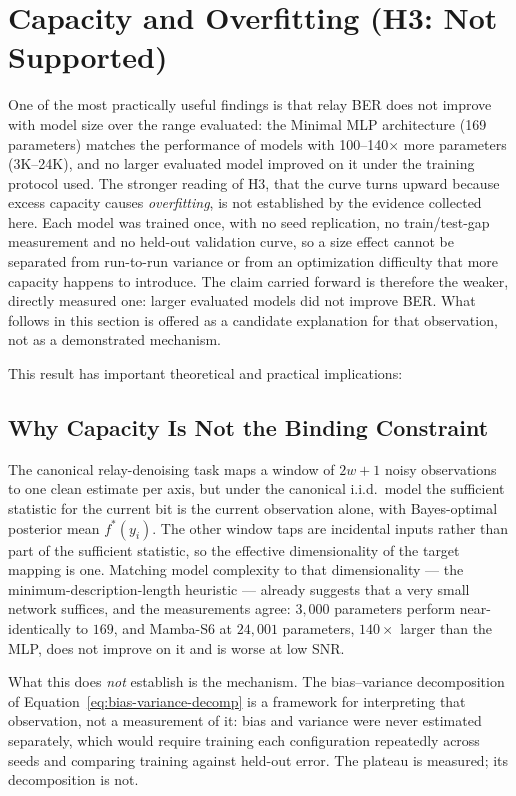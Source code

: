 \section{Capacity and Overfitting (H3: Not Supported)}\label{sec:capacity-and-overfitting}

One of the most practically useful findings is that relay BER does not improve with model size over the range evaluated: the Minimal MLP architecture (169 parameters) matches the performance of models with 100--140$\times$ more parameters (3K--24K), and no larger evaluated model improved on it under the training protocol used. The stronger reading of H3, that the curve turns upward because excess capacity causes \emph{overfitting}, is not established by the evidence collected here. Each model was trained once, with no seed replication, no train/test-gap measurement and no held-out validation curve, so a size effect cannot be separated from run-to-run variance or from an optimization difficulty that more capacity happens to introduce. The claim carried forward is therefore the weaker, directly measured one: larger evaluated models did not improve BER. What follows in this section is offered as a candidate explanation for that observation, not as a demonstrated mechanism.

This result has important theoretical and practical implications:

\subsection{Why Capacity Is Not the Binding Constraint}\label{sec:information-theoretic-perspective}

The canonical relay-denoising task maps a window of $2w+1$ noisy observations to one clean estimate per
axis, but under the canonical i.i.d.\ model the sufficient statistic for the current bit is the current
observation alone, with Bayes-optimal posterior mean $f^*(y_i)$. The other window taps are incidental inputs
rather than part of the sufficient statistic, so the effective dimensionality of the target mapping is one.
Matching model complexity to that dimensionality --- the minimum-description-length heuristic --- already
suggests that a very small network suffices, and the measurements agree: $3{,}000$ parameters perform
near-identically to $169$, and Mamba-S6 at $24{,}001$ parameters, $140\times$ larger than the MLP, does not
improve on it and is worse at low SNR.

What this does \emph{not} establish is the mechanism. The bias--variance decomposition of
Equation~\ref{eq:bias-variance-decomp} is a framework for interpreting that observation, not a measurement of
it: bias and variance were never estimated separately, which would require training each configuration
repeatedly across seeds and comparing training against held-out error. The plateau is measured; its
decomposition is not.

